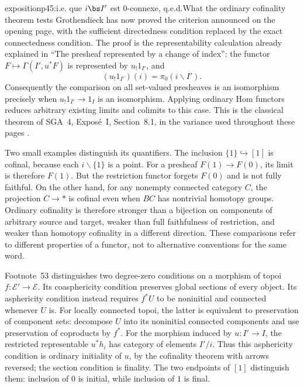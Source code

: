 \begin{dcomment}{exposition}{p45:i.e. que $i\bs I'$ est 0-connexe, q.e.d.}{What the ordinary cofinality theorem tests}
Grothendieck has now proved the criterion announced on the opening page, with the sufficient directedness condition replaced by the exact connectedness condition. The proof is the representability calculation already explained in ``The presheaf represented by a change of index'': the functor $F\longmapsto\Gamma(I',u^*F)$ is represented by $u_!1_{I'}$, and
\[
 (u_!1_{I'})(i)=\pi_0(i\backslash I').
\]
Consequently the comparison on all set-valued presheaves is an isomorphism precisely when $u_!1_{I'}\longrightarrow1_I$ is an isomorphism. Applying ordinary Hom functors reduces arbitrary existing limits and colimits to this case. This is the classical theorem of SGA~4, Expos\'e~I, Section~8.1, in the variance used throughout these pages \citep{SGA4I1972}.

Two small examples distinguish its quantifiers. The inclusion $\{1\}\hookrightarrow[1]$ is cofinal, because each $i\backslash\{1\}$ is a point. For a presheaf $F(1)\longrightarrow F(0)$, its limit is therefore $F(1)$. But the restriction functor forgets $F(0)$ and is not fully faithful. On the other hand, for any nonempty connected category $C$, the projection $C\longrightarrow *$ is cofinal even when $BC$ has nontrivial homotopy groups. Ordinary cofinality is therefore stronger than a bijection on components of arbitrary source and target, weaker than full faithfulness of restriction, and weaker than homotopy cofinality in a different direction. These comparisons refer to different properties of a functor, not to alternative conventions for the same word.

Footnote~53 distinguishes two degree-zero conditions on a morphism of topoi $f:\mathcal E'\longrightarrow\mathcal E$. Its coasphericity condition preserves global sections of every object. Its asphericity condition instead requires $f^*U$ to be noninitial and connected whenever $U$ is. For locally connected topoi, the latter is equivalent to preservation of component sets: decompose $U$ into its noninitial connected components and use preservation of coproducts by $f^*$. For the morphism induced by $u:I'\longrightarrow I$, the restricted representable $u^*h_i$ has category of elements $I'/i$. Thus this asphericity condition is ordinary initiality of $u$, by the cofinality theorem with arrows reversed; the section condition is finality. The two endpoints of $[1]$ distinguish them: inclusion of $0$ is initial, while inclusion of $1$ is final.


\end{dcomment}
